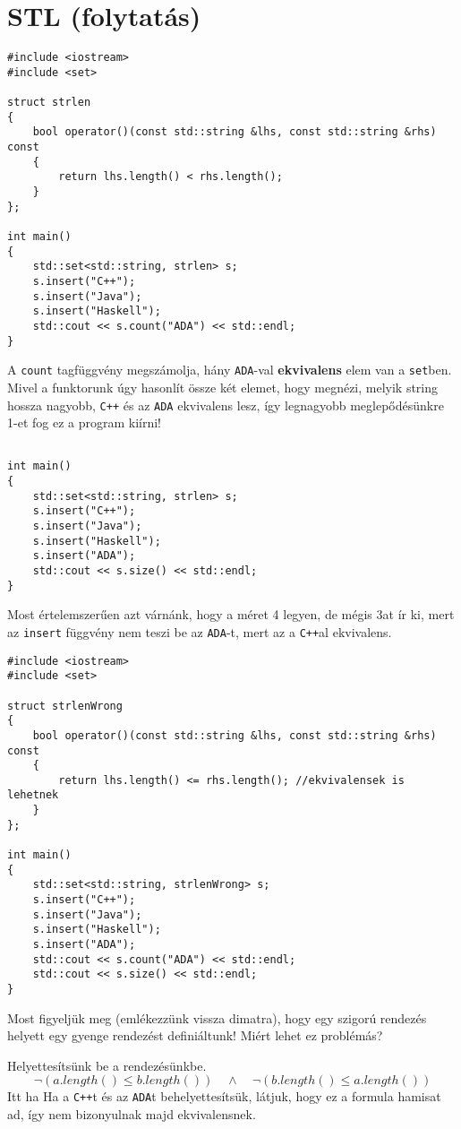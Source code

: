 \documentclass[a4paper,11.5pt]{article}
\begin{document}
	\section{STL (folytatás)}
	\begin{lstlisting}
#include <iostream>
#include <set>

struct strlen
{
	bool operator()(const std::string &lhs, const std::string &rhs) const
	{
		return lhs.length() < rhs.length();
	}
};

int main()
{
	std::set<std::string, strlen> s;
	s.insert("C++");
	s.insert("Java");
	s.insert("Haskell");
	std::cout << s.count("ADA") << std::endl;
}
	\end{lstlisting}
	A \texttt{count} tagfüggvény megszámolja, hány \texttt{ADA}-val \textbf{ekvivalens} elem van a \texttt{set}ben. Mivel a funktorunk úgy hasonlít össze két elemet, hogy megnézi, melyik string hossza nagyobb,  \texttt{C++} és az \texttt{ADA} ekvivalens lesz, így legnagyobb meglepődésünkre 1-et fog ez a program kiírni!
\begin{lstlisting}

int main()
{
	std::set<std::string, strlen> s;
	s.insert("C++");
	s.insert("Java");
	s.insert("Haskell");
	s.insert("ADA");
	std::cout << s.size() << std::endl;
}
\end{lstlisting}
	Most értelemszerűen azt várnánk, hogy a méret 4 legyen, de mégis 3at ír ki, mert az \texttt{insert} függvény nem teszi be az \texttt{ADA}-t, mert az a \texttt{C++}al ekvivalens.
\begin{lstlisting}
#include <iostream>
#include <set>

struct strlenWrong
{
	bool operator()(const std::string &lhs, const std::string &rhs) const
	{
		return lhs.length() <= rhs.length(); //ekvivalensek is lehetnek
	}
};

int main()
{
	std::set<std::string, strlenWrong> s;
	s.insert("C++");
	s.insert("Java");
	s.insert("Haskell");
	s.insert("ADA");
	std::cout << s.count("ADA") << std::endl;
	std::cout << s.size() << std::endl;
}
\end{lstlisting}
	Most figyeljük meg (emlékezzünk vissza dimatra), hogy egy szigorú rendezés helyett egy gyenge rendezést definiáltunk! Miért lehet ez problémás?
	
	\smallskip
	Helyettesítsünk be a rendezésünkbe.
	\[ \neg(a.length() \leq b.length())\quad \wedge \quad \neg(b.length() \leq a.length()) \]
	Itt ha Ha a \texttt{C++}t és az \texttt{ADA}t behelyettesítsük, látjuk, hogy ez a formula hamisat ad, így nem bizonyulnak majd ekvivalensnek.
	
\end{document}
